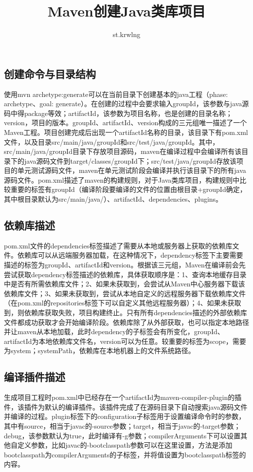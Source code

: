 \documentclass[UTF8]{ctexart}
\title{Maven创建Java类库项目}
\author{st.krwlng}
\begin{document}
    \maketitle
    \tableofcontents
    \subsection{创建命令与目录结构} 使用mvn archetype:generate可以在当前目录下创建基本的java工程（phase: archetype、goal: generate）。在创建的过程中会要求输入groupId，该参数与java源码中得package等效；artifactId，该参数为项目名称，也是创建的目录名称；version，项目的版本。groupId、artifactId、version构成的三元组唯一描述了一个Maven工程。项目创建完成后出现一个{artifactId}名称的目录，该目录下有pom.xml文件，以及目录src/main/java/{groupId}和src/test/java/{groupId}。其中，src/main/java/{groupId}目录下存放项目源码，maven在编译过程中会编译所有该目录下的java源码文件到target/classes/{groupId}下；src/test/java/{groupId}存放该项目的单元测试源码文件，maven在单元测试阶段会编译并执行该目录下的所有java源码文件。pom.xml描述了maven的构建规则，对于Java类库项目，构建规则中比较重要的标签有groupId（编译阶段要编译的文件的位置由根目录+groupId确定，其中根目录默认为src/main/java/）、artifactId、dependencies、plugins。
    \subsection{依赖库描述} pom.xml文件的dependencies标签描述了需要从本地或服务器上获取的依赖库文件。依赖库可以从远端服务器加载，在这种情况下，dependency标签下主要需要描述的标签为groupId、artifactId和version。根据该三元组，Maven在编译前会先尝试获取dependency标签描述的依赖库，具体获取顺序是：1、查询本地缓存目录中是否有所需依赖库文件；2、如果未获取到，会尝试从Maven中心服务器下载该依赖库文件；3、如果未获取到，尝试从本地自定义的远程服务器下载依赖库文件（在pom.xml的repositories标签下可以自定义其他远程服务器）；4、如果未获取到，则依赖库获取失败，项目构建终止。只有所有dependencies描述的外部依赖库文件都成功获取才会开始编译阶段。依赖库除了从外部获取，也可以指定本地路径并让maven从本地加载，此时dependency的子标签会有所变化，groupId、artifactId为本地依赖库文件名，version可以为任意。较重要的标签为scope，需要为system；systemPath，依赖库在本地机器上的文件系统路径。
    \subsection{编译插件描述} 生成项目工程时pom.xml中已经存在一个artifactId为maven-compiler-plugin的插件，该插件为默认的编译插件。该插件完成了在源码目录下自动搜索java源码文件并编译的过程。plugin标签下的configuration子标签用于设置编译命令时的参数，其中有source，相当于javac的-source参数；target，相当于javac的-target参数；debug，该参数默认为true，此时编译有-g参数；compilerArguments下可以设置其他自定义参数，比如javac的-bootclasspath参数可以在这里设置，方法是添加bootclasspath为compilerArguments的子标签，并将值设置为bootclasspath标签的内容。
\end{document}
